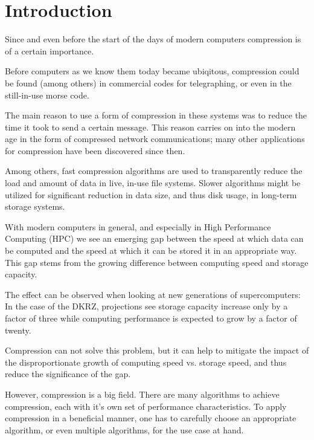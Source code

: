 \documentclass[
	12pt,
	a4paper,
	BCOR10mm,
	DIV14,
	listof=totoc,
	bibliography=totoc,
	headsepline
]{scrreprt}
\begin{document}
   

\tableofcontents

\chapter{Introduction}
\label{Introduction}

Since and even before the start of the days of modern computers compression is of a certain importance.

Before computers as we know them today became ubiqitous, compression could be found (among others) in commercial codes for telegraphing\cite{com}, or even in the still-in-use morse code.

The main reason to use a form of compression in these systems was to reduce the time it took to send a certain message. This reason carries on into the modern age in the form of compressed network communications; many other applications for compression have been discovered since then.

Among others, fast compression algorithms are used to transparently reduce the load and amount of data in live, in-use file systems. Slower algorithms might be utilized for significant reduction in data size, and thus disk usage, in long-term storage systems.

With modern computers in general, and especially in High Performance Computing (HPC) we see an emerging gap between the speed at which data can be computed and the speed at which it can be stored it in an appropriate way. 
This gap stems from the growing difference between computing speed and storage capacity\cite{ExaStoSy}.

The effect can be observed when looking at new generations of supercomputers: 
In the case of the DKRZ, projections see storage capacity increase only by a factor of three while computing performance is expected to grow by a factor of twenty\cite{ExaStoSy}.

Compression can not solve this problem, but it can help to mitigate the impact of the disproportionate growth of computing speed vs. storage speed, and thus reduce the significance of the gap. 

However, compression is a big field. There are many algorithms to achieve compression, each with it's own set of performance characteristics. To apply compression in a beneficial manner, one has to carefully choose an appropriate algorithm, or even multiple algorithms, for the use case at hand.
\end{document}
